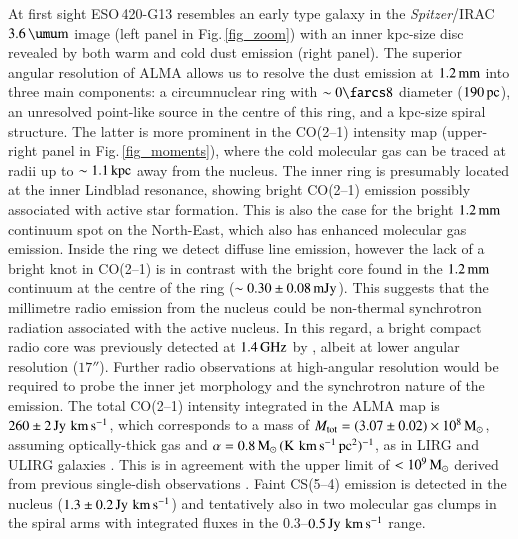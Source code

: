 \documentclass[longauth]{aa}
\newcommand{\kms}{\,\hbox{\hbox{km}\,\hbox{s}$^{-1}$}}
\def\micron{\hbox{$\umu$m}}
\begin{document}
At first sight ESO\,420-G13 resembles an early type galaxy in the \textit{Spitzer}/IRAC $3.6\, \rm{\micron}$ image (left panel in Fig.\,\ref{fig_zoom}) with an inner kpc-size disc revealed by both warm and cold dust emission (right panel). The superior angular resolution of ALMA allows us to resolve the dust emission at $1.2\, \rm{mm}$ into three main components: a circumnuclear ring with $\sim 0\farcs8$ diameter ($190\, \rm{pc}$), an unresolved point-like source in the centre of this ring, and a kpc-size spiral structure. The latter is more prominent in the CO(2--1) intensity map (upper-right panel in Fig.\,\ref{fig_moments}), where the cold molecular gas can be traced at radii up to $\sim 1.1\, \rm{kpc}$ away from the nucleus. The inner ring is presumably located at the inner Lindblad resonance, showing bright CO(2--1) emission possibly associated with active star formation. This is also the case for the bright $1.2\, \rm{mm}$ continuum spot on the North-East, which also has enhanced molecular gas emission. Inside the ring we detect diffuse line emission, however the lack of a bright knot in CO(2--1) is in contrast with the bright core found in the $1.2\, \rm{mm}$ continuum at the centre of the ring ($\sim 0.30 \pm 0.08\, \rm{mJy}$). This suggests that the millimetre radio emission from the nucleus could be non-thermal synchrotron radiation associated with the active nucleus. In this regard, a bright compact radio core was previously detected at $1.4\, \rm{GHz}$ by , albeit at lower angular resolution ($17''$). Further radio observations at high-angular resolution would be required to probe the inner jet morphology and the synchrotron nature of the emission. The total CO(2--1) intensity integrated in the ALMA map is $260 \pm 2\, \rm{Jy\,\kms}$, which corresponds to a mass of $M_{\rm tot} = (3.07 \pm 0.02) \times 10^8\, \rm{M_\odot}$, assuming optically-thick gas and $\alpha = 0.8\, \rm{M_\odot\,(K\,\kms\,pc^2)^{-1}}$, as in LIRG and ULIRG galaxies . This is in agreement with the upper limit of $< 10^9\, \rm{M_\odot}$ derived from previous single-dish observations . Faint CS(5--4) emission is detected in the nucleus ($1.3 \pm 0.2\, \rm{Jy\,\kms}$) and tentatively also in two molecular gas clumps in the spiral arms with integrated fluxes in the $0.3$--$0.5\, \rm{Jy\,\kms}$ range.
\end{document}
